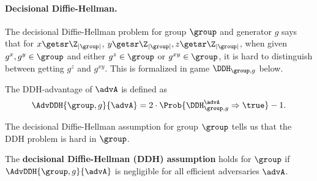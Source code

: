 \paragraph{Decisional Diffie-Hellman.} The decisional Diffie-Hellman problem for group $\group$ and generator $g$ says that for $x \getsr \Z_{|\group|}$, $y \getsr \Z_{|\group|}, z \getsr \Z_{|\group|}$, when given $g^x,g^y \in \group$ and either $g^z \in \group$ or $g^{xy} \in \group$, it is hard to distinguish between getting $g^z$ and $g^{xy}$. This is formalized in game $\DDH_{\group,g}$ below.  

\begin{center}

\end{center}

The DDH-advantage of $\advA$ is defined as 
\begin{equation*}
\AdvDDH{\group, g}{\advA} = 2 \cdot \Prob{\DDH_{\group, g}^\advA\Rightarrow\true} - 1.
\end{equation*}

The decisional Diffie-Hellman assumption for group $\group$ tells us that the DDH problem is hard in $\group$. 

\begin{definition}
	The \textbf{decisional Diffie-Hellman (DDH) assumption} holds for $\group$ if $\AdvDDH{\group, g}{\advA}$ is negligible for all efficient adversaries $\advA$.
\end{definition}

